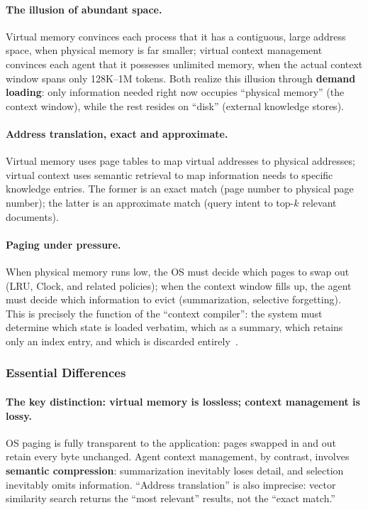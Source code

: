 \paragraph{The illusion of abundant space.}
Virtual memory convinces each process that it has a contiguous, large address space, when physical memory is far smaller; virtual context management convinces each agent that it possesses unlimited memory, when the actual context window spans only 128K--1M tokens.
Both realize this illusion through \textbf{demand loading}: only information needed right now occupies ``physical memory'' (the context window), while the rest resides on ``disk'' (external knowledge stores).

\paragraph{Address translation, exact and approximate.}
Virtual memory uses page tables to map virtual addresses to physical addresses; virtual context uses semantic retrieval to map information needs to specific knowledge entries.
The former is an exact match (page number to physical page number); the latter is an approximate match (query intent to top-$k$ relevant documents).

\paragraph{Paging under pressure.}
When physical memory runs low, the OS must decide which pages to swap out (LRU, Clock, and related policies); when the context window fills up, the agent must decide which information to evict (summarization, selective forgetting).
This is precisely the function of the ``context compiler'': the system must determine which state is loaded verbatim, which as a summary, which retains only an index entry, and which is discarded entirely~\cite{contextcompiler2025}.

\subsubsection{Essential Differences}

\paragraph{The key distinction: virtual memory is lossless; context management is lossy.}
OS paging is fully transparent to the application: pages swapped in and out retain every byte unchanged.
Agent context management, by contrast, involves \textbf{semantic compression}: summarization inevitably loses detail, and selection inevitably omits information.
``Address translation'' is also imprecise: vector similarity search returns the ``most relevant'' results, not the ``exact match.''

